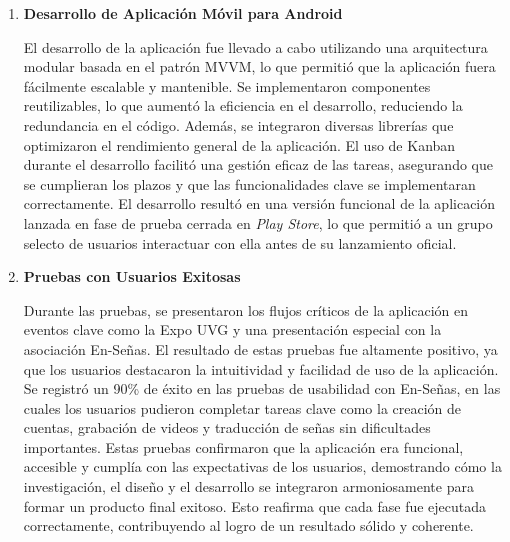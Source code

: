 \begin{enumerate}
    
    \item \textbf{Desarrollo de Aplicación Móvil para Android}
    
    El desarrollo de la aplicación fue llevado a cabo utilizando una arquitectura modular basada en el patrón MVVM, lo que permitió que la aplicación fuera fácilmente escalable y mantenible. Se implementaron componentes reutilizables, lo que aumentó la eficiencia en el desarrollo, reduciendo la redundancia en el código. Además, se integraron diversas librerías que optimizaron el rendimiento general de la aplicación. El uso de Kanban durante el desarrollo facilitó una gestión eficaz de las tareas, asegurando que se cumplieran los plazos y que las funcionalidades clave se implementaran correctamente. El desarrollo resultó en una versión funcional de la aplicación lanzada en fase de prueba cerrada en \textit{Play Store}, lo que permitió a un grupo selecto de usuarios interactuar con ella antes de su lanzamiento oficial. 


    \item \textbf{Pruebas con Usuarios Exitosas}
    
    Durante las pruebas, se presentaron los flujos críticos de la aplicación en eventos clave como la Expo UVG y una presentación especial con la asociación En-Señas. El resultado de estas pruebas fue altamente positivo, ya que los usuarios destacaron la intuitividad y facilidad de uso de la aplicación. Se registró un 90\% de éxito en las pruebas de usabilidad con En-Señas, en las cuales los usuarios pudieron completar tareas clave como la creación de cuentas, grabación de videos y traducción de señas sin dificultades importantes. Estas pruebas confirmaron que la aplicación era funcional, accesible y cumplía con las expectativas de los usuarios, demostrando cómo la investigación, el diseño y el desarrollo se integraron armoniosamente para formar un producto final exitoso. Esto reafirma que cada fase fue ejecutada correctamente, contribuyendo al logro de un resultado sólido y coherente.
    
\end{enumerate}
